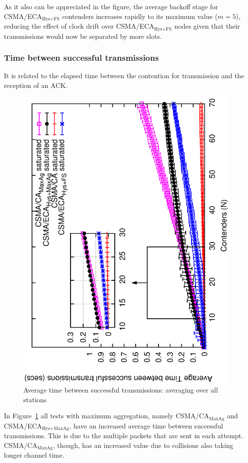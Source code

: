\documentclass[a4paper,journal]{IEEEtran}
\begin{document}
	As it also can be appreciated in the figure, the average backoff stage for CSMA/ECA$_{\text{Hys+FS}}$ contenders increases rapidly to its maximum value ($m=5$), reducing the effect of clock drift over CSMA/ECA$_{\text{Hys+FS}}$ nodes given that their transmissions would now be separated by more slots.\\
	
	\subsubsection{Time between successful transmissions}\label{timeBetweenSxTx}
	It is related to the elapsed time between the contention for transmission and the reception of an ACK.

	\begin{figure}[tb]
		\centering
		\includegraphics[width=0.7\linewidth,angle=-90]{figures/saturated/timeBetweenSxTx-sat/timeBetweenSxTx-multiplot-sat.eps}
		\caption{Average time between successful transmissions: averaging over all stations}
		\label{fig:serviceTime-sat}
	\end{figure}
	
	In Figure~\ref{fig:serviceTime-sat} all tests with maximum aggregation, namely CSMA/CA$_{\text{MaxAg}}$ and CSMA/ECA$_{\text{Hys+MaxAg}}$, have an increased average time between successful transmissions. This is due to the multiple packets that are sent in each attempt. CSMA/CA$_{\text{MaxAg}}$, though, has an increased value due to collisions also taking longer channel time.
	
\end{document}

